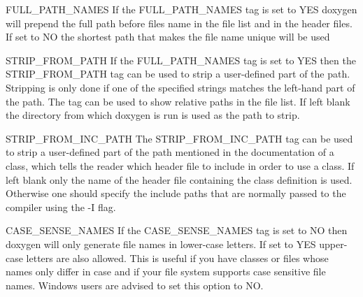 \begin{DoxyDescription}
\item[{\ttfamily FULL\_\-PATH\_\-NAMES} ] If the {\ttfamily FULL\_\-PATH\_\-NAMES} tag is set to {\ttfamily YES} doxygen will prepend the full path before files name in the file list and in the header files. If set to NO the shortest path that makes the file name unique will be used

\label{config_cfg_strip_from_path}
\hypertarget{config_cfg_strip_from_path}{}
 
\item[{\ttfamily STRIP\_\-FROM\_\-PATH} ] If the {\ttfamily FULL\_\-PATH\_\-NAMES} tag is set to {\ttfamily YES} then the {\ttfamily STRIP\_\-FROM\_\-PATH} tag can be used to strip a user-\/defined part of the path. Stripping is only done if one of the specified strings matches the left-\/hand part of the path. The tag can be used to show relative paths in the file list. If left blank the directory from which doxygen is run is used as the path to strip.

\label{config_cfg_strip_from_inc_path}
\hypertarget{config_cfg_strip_from_inc_path}{}
 
\item[{\ttfamily STRIP\_\-FROM\_\-INC\_\-PATH} ] The {\ttfamily STRIP\_\-FROM\_\-INC\_\-PATH} tag can be used to strip a user-\/defined part of the path mentioned in the documentation of a class, which tells the reader which header file to include in order to use a class. If left blank only the name of the header file containing the class definition is used. Otherwise one should specify the include paths that are normally passed to the compiler using the -\/I flag.

\label{config_cfg_case_sense_names}
\hypertarget{config_cfg_case_sense_names}{}
 
\item[{\ttfamily CASE\_\-SENSE\_\-NAMES} ] If the {\ttfamily CASE\_\-SENSE\_\-NAMES} tag is set to {\ttfamily NO} then doxygen will only generate file names in lower-\/case letters. If set to {\ttfamily YES} upper-\/case letters are also allowed. This is useful if you have classes or files whose names only differ in case and if your file system supports case sensitive file names. Windows users are advised to set this option to NO.

\label{config_cfg_short_names}
\hypertarget{config_cfg_short_names}{}
 

\end{DoxyDescription}

